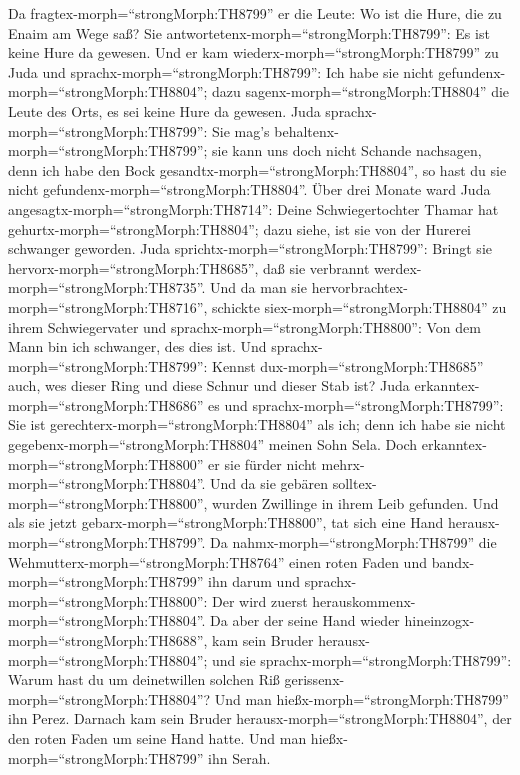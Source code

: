  Da fragtex-morph=``strongMorph:TH8799'' er die Leute: Wo
ist die Hure, die zu Enaim am Wege saß? Sie
antwortetenx-morph=``strongMorph:TH8799'': Es ist keine Hure da gewesen.
 Und er kam wiederx-morph=``strongMorph:TH8799'' zu Juda
und sprachx-morph=``strongMorph:TH8799'': Ich habe sie nicht
gefundenx-morph=``strongMorph:TH8804''; dazu
sagenx-morph=``strongMorph:TH8804'' die Leute des Orts, es sei keine
Hure da gewesen.  Juda
sprachx-morph=``strongMorph:TH8799'': Sie mag's
behaltenx-morph=``strongMorph:TH8799''; sie kann uns doch nicht Schande
nachsagen, denn ich habe den Bock gesandtx-morph=``strongMorph:TH8804'',
so hast du sie nicht gefundenx-morph=``strongMorph:TH8804''.
 Über drei Monate ward Juda
angesagtx-morph=``strongMorph:TH8714'': Deine Schwiegertochter Thamar
hat gehurtx-morph=``strongMorph:TH8804''; dazu siehe, ist sie von der
Hurerei schwanger geworden. Juda sprichtx-morph=``strongMorph:TH8799'':
Bringt sie hervorx-morph=``strongMorph:TH8685'', daß sie verbrannt
werdex-morph=``strongMorph:TH8735''.  Und da man sie
hervorbrachtex-morph=``strongMorph:TH8716'', schickte
siex-morph=``strongMorph:TH8804'' zu ihrem Schwiegervater und
sprachx-morph=``strongMorph:TH8800'': Von dem Mann bin ich schwanger,
des dies ist. Und sprachx-morph=``strongMorph:TH8799'': Kennst
dux-morph=``strongMorph:TH8685'' auch, wes dieser Ring und diese Schnur
und dieser Stab ist?  Juda
erkanntex-morph=``strongMorph:TH8686'' es und
sprachx-morph=``strongMorph:TH8799'': Sie ist
gerechterx-morph=``strongMorph:TH8804'' als ich; denn ich habe sie nicht
gegebenx-morph=``strongMorph:TH8804'' meinen Sohn Sela. Doch
erkanntex-morph=``strongMorph:TH8800'' er sie fürder nicht
mehrx-morph=``strongMorph:TH8804''.  Und da sie gebären
solltex-morph=``strongMorph:TH8800'', wurden Zwillinge in ihrem Leib
gefunden.  Und als sie jetzt
gebarx-morph=``strongMorph:TH8800'', tat sich eine Hand
herausx-morph=``strongMorph:TH8799''. Da
nahmx-morph=``strongMorph:TH8799'' die
Wehmutterx-morph=``strongMorph:TH8764'' einen roten Faden und
bandx-morph=``strongMorph:TH8799'' ihn darum und
sprachx-morph=``strongMorph:TH8800'': Der wird zuerst
herauskommenx-morph=``strongMorph:TH8804''.  Da aber der
seine Hand wieder hineinzogx-morph=``strongMorph:TH8688'', kam sein
Bruder herausx-morph=``strongMorph:TH8804''; und sie
sprachx-morph=``strongMorph:TH8799'': Warum hast du um deinetwillen
solchen Riß gerissenx-morph=``strongMorph:TH8804''? Und man
hießx-morph=``strongMorph:TH8799'' ihn Perez.  Darnach kam
sein Bruder herausx-morph=``strongMorph:TH8804'', der den roten Faden um
seine Hand hatte. Und man hießx-morph=``strongMorph:TH8799'' ihn Serah.

